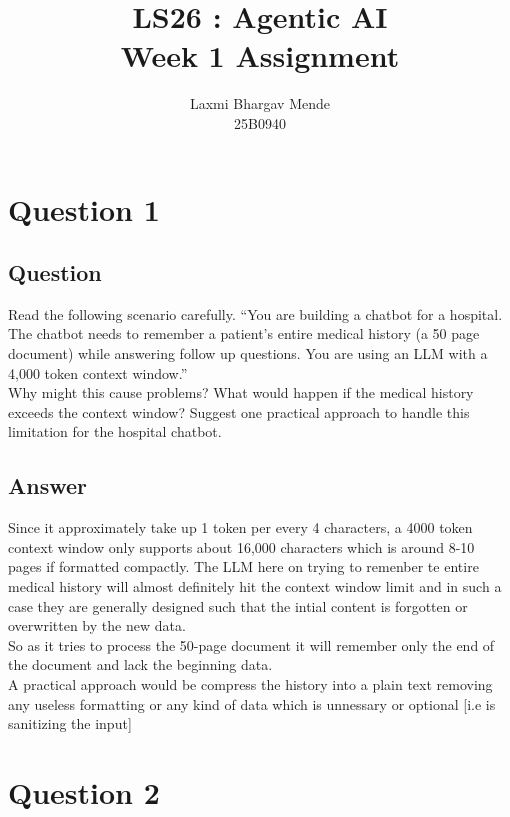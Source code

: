 \documentclass{article}
\begin{document}
\title{LS26 : Agentic AI \\ \textbf{Week 1 Assignment}}
\author{Laxmi Bhargav Mende \\ 25B0940}

\maketitle
\tableofcontents
\newpage

\section{Question 1}
\subsection{Question}
Read the following scenario carefully.
“You are building a chatbot for a hospital. The chatbot needs to remember a
patient’s entire medical history (a 50 page document) while answering
follow up questions. You are using an LLM with a 4,000 token context
window.”\\
Why might this cause problems? What would happen if the medical history
exceeds the context window? Suggest one practical approach to handle this
limitation for the hospital chatbot.
\subsection{Answer}
Since it approximately take up 1 token per every 4 characters, a 4000 token context window only supports about 16,000 characters which is around 8-10 pages if formatted compactly.
The LLM here on trying to remenber te entire medical history will almost definitely hit the context window limit and in such a case they are generally designed such that the intial
content is forgotten or overwritten by the new data.\\
So as it tries to process the 50-page document it will remember only the end of the document and lack the beginning data.\\
A practical approach would be compress the history into a plain text removing any useless formatting or any kind of data which is unnessary or optional [i.e is sanitizing the input]


\newpage
\section{Question 2}
\end{document}

